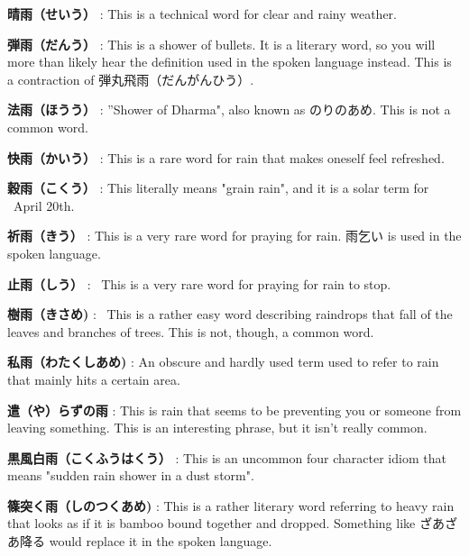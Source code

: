 \par{\textbf{晴雨（せいう） }: This is a technical word for clear and rainy weather. }

\par{\textbf{弾雨（だんう） }: This is a shower of bullets. It is a literary word, so you will more than likely hear the definition used in the spoken language instead. This is a contraction of 弾丸飛雨（だんがんひう）. }

\par{\textbf{法雨（ほうう） }: ”Shower of Dharma", also known as のりのあめ. This is not a common word. }

\par{\textbf{快雨（かいう） }: This is a rare word for rain that makes oneself feel refreshed. }

\par{\textbf{穀雨（こくう） }: This literally means "grain rain", and it is a solar term for ~April 20th. }

\par{\textbf{祈雨（きう） }: This is a very rare word for praying for rain. 雨乞い is used in the spoken language. }

\par{\textbf{止雨（しう） }:  This is a very rare word for praying for rain to stop. }

\par{\textbf{樹雨（きさめ) }:  This is a rather easy word describing raindrops that fall of the leaves and branches of trees. This is not, though, a common word. }

\par{\textbf{私雨（わたくしあめ) }: An obscure and hardly used term used to refer to rain that mainly hits a certain area. }

\par{\textbf{遣（や）らずの雨 }: This is rain that seems to be preventing you or someone from leaving something. This is an interesting phrase, but it isn't really common. }

\par{\textbf{黒風白雨（こくふうはくう） }: This is an uncommon four character idiom that means "sudden rain shower in a dust storm". }

\par{\textbf{篠突く雨（しのつくあめ) }: This is a rather literary word referring to heavy rain that looks as if it is bamboo bound together and dropped. Something like ざあざあ降る would replace it in the spoken language. }

